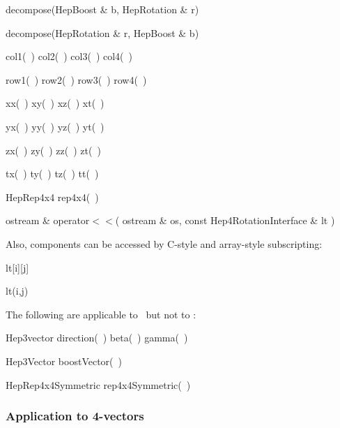 \begin{shortlist}
  \item decompose(HepBoost \& b, HepRotation \& r)  	\see{\ref{eq:decomBR}}
  \item decompose(HepRotation \& r, HepBoost \& b)  	\see{\ref{eq:decomRB}}
  \item col1(~) \/\/\/ col2(~) \/\/\/ col3(~) \/\/\/ col4(~) 
  \item row1(~) \/\/\/ row2(~) \/\/\/ row3(~) \/\/\/ row4(~) 
  \item xx(~) \/\/\/ xy(~) \/\/\/ xz(~) \/\/\/ xt(~) 
  \item yx(~) \/\/\/ yy(~) \/\/\/ yz(~) \/\/\/ yt(~) 
  \item zx(~) \/\/\/ zy(~) \/\/\/ zz(~) \/\/\/ zt(~) 
  \item tx(~) \/\/\/ ty(~) \/\/\/ tz(~) \/\/\/ tt(~) 

  \item HepRep4x4 rep4x4(~) 	
\end{shortlist}

\begin{shortlist}
  \item ostream \& operator$<<$( ostream \& os, const Hep4RotationInterface \& lt )
\end{shortlist}

\noindent
Also, components can be accessed by C-style and array-style subscripting:
\begin{shortlist}
  \item lt[i][j] \see{\ref{eq:ltsubscript}}
  \item lt(i,j)  \see{\ref{eq:ltsubscript}}
\end{shortlist}

The following are applicable to \LB\ but not to \LT:

\begin{shortlist}
  \item Hep3vector direction(~)	\/\/\/ beta(~) \/\/\/ gamma(~)
  \item Hep3Vector boostVector(~)
  \item HepRep4x4Symmetric rep4x4Symmetric(~) 
\end{shortlist}

\subsubsection{Application to 4-vectors}

